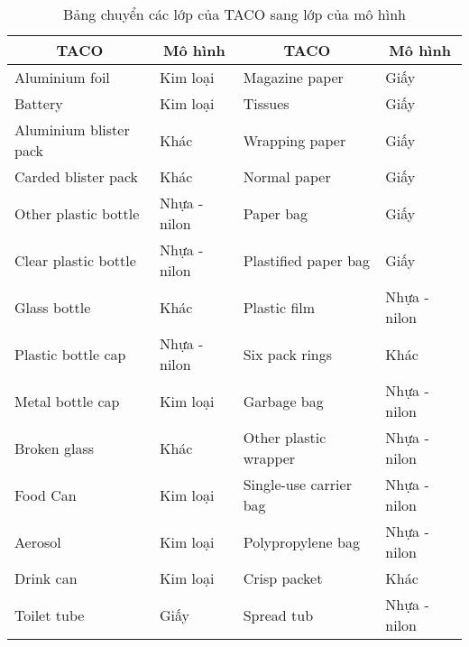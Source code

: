 \documentclass[../the.tex]{subfiles}
\begin{document}
\begin{table}[!h]
	\centering
	\caption{Bảng chuyển các lớp của TACO sang lớp của mô hình}
	\begin{tabular}{|l|l|l|l|}
		\hline
		\multicolumn{1}{|c|}{\textbf{TACO}}
		                       & \multicolumn{1}{c|}{\textbf{Mô hình}}
		                       & \multicolumn{1}{c|}{\textbf{TACO}}
		                       & \multicolumn{1}{c|}{\textbf{Mô hình}}                                            \\
		\hline
		Aluminium foil         & Kim loại                              & Magazine paper            & Giấy         \\ \hline
		Battery                & Kim loại                              & Tissues                   & Giấy         \\ \hline
		Aluminium blister pack & Khác                                  & Wrapping paper            & Giấy         \\ \hline
		Carded blister pack    & Khác                                  & Normal paper              & Giấy         \\ \hline
		Other plastic bottle   & Nhựa - nilon                          & Paper bag                 & Giấy         \\ \hline
		Clear plastic bottle   & Nhựa - nilon                          & Plastified paper bag      & Giấy         \\ \hline
		Glass bottle           & Khác                                  & Plastic film              & Nhựa - nilon \\ \hline
		Plastic bottle cap     & Nhựa - nilon                          & Six pack rings            & Khác         \\ \hline
		Metal bottle cap       & Kim loại                              & Garbage bag               & Nhựa - nilon \\ \hline
		Broken glass           & Khác                                  & Other plastic wrapper     & Nhựa - nilon \\ \hline
		Food Can               & Kim loại                              & Single-use carrier bag    & Nhựa - nilon \\ \hline
		Aerosol                & Kim loại                              & Polypropylene bag         & Nhựa - nilon \\ \hline
		Drink can              & Kim loại                              & Crisp packet              & Khác         \\ \hline
		Toilet tube            & Giấy                                  & Spread tub                & Nhựa - nilon \\ \hline

\end{tabular}
\end{table}
\end{document}
